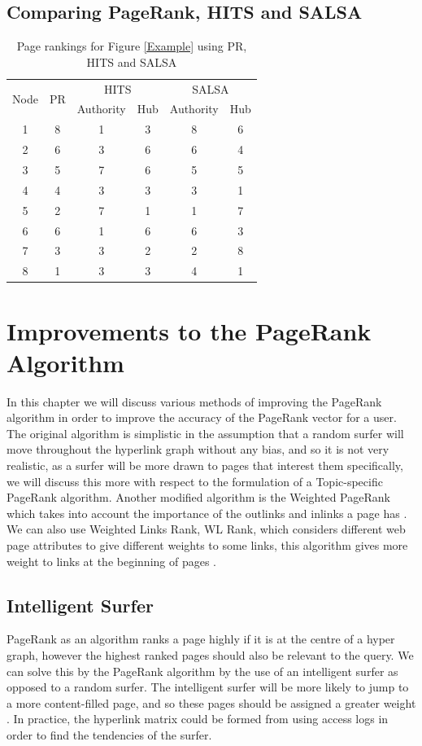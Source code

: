 \documentclass[11pt]{report}
\begin{document}
\section{Comparing PageRank, HITS and SALSA}

\cite{devi2014comparative}

\begin{table}[H] \caption{Page rankings for Figure \ref{Example} using PR, HITS and SALSA }
 \centering
 \begin{tabular} {c| c| c| c| c| c} 
 \multirow{2}{*}{Node} & \multirow{2}{*}{PR} & \multicolumn{2}{|c|}{HITS} & \multicolumn{2}{|c}{SALSA} \\ [0.5ex] 
 {}&{}&Authority & Hub & Authority & Hub\\ 
 \hline
 1&8&1&3&8&6\\
 2&6&3&6&6&4\\
 3&5&7&6&5&5\\
 4&4&3&3&3&1\\
 5&2&7&1&1&7\\
 6&6&1&6&6&3\\
 7&3&3&2&2&8\\
 8&1&3&3&4&1\\
 \end{tabular}
 \label{comparison}
\end{table}

\chapter{Improvements to the PageRank Algorithm}

In this chapter we will discuss various methods of improving the PageRank algorithm in order to improve the accuracy of the PageRank vector for a user. The original algorithm is simplistic in the assumption that a random surfer will move throughout the hyperlink graph without any bias, and so it is not very realistic, as a surfer will be more drawn to pages that interest them specifically, we will discuss this more with respect to the formulation of a Topic-specific PageRank algorithm. Another modified algorithm is the Weighted PageRank which takes into account the importance of the outlinks and inlinks a page has \cite{xing2004weighted}. We can also use Weighted Links Rank, WL Rank, which considers different web page attributes to give different weights to some links, this algorithm gives more weight to links at the beginning of pages \cite{baeza2004web}.

\section{Intelligent Surfer}
PageRank as an algorithm ranks a page highly if it is at the centre of a hyper graph, however the highest ranked pages should also be relevant to the query. We can solve this by the PageRank algorithm by the use of an intelligent surfer as opposed to a random surfer. The intelligent surfer will be more likely to jump to a more content-filled page, and so these pages should be assigned a greater weight \cite{langville}. In practice, the hyperlink matrix could be formed from using access logs in order to find the tendencies of the surfer. 
\end{document}

